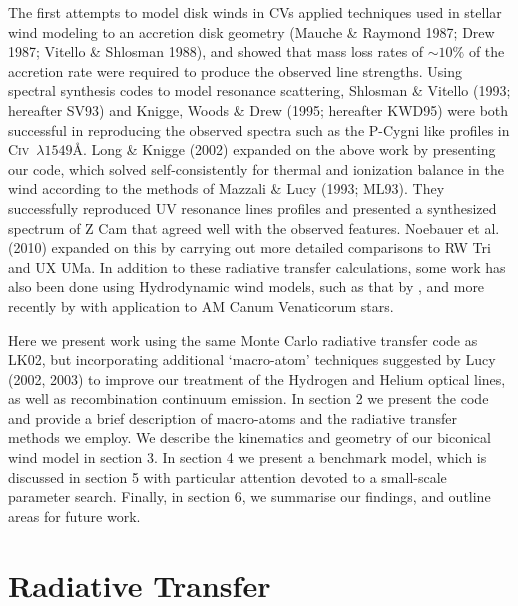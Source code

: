 \documentclass[preprint, a4paper, 11pt]{aastex}
\begin{document}
The first attempts to model disk winds in CVs applied techniques used in stellar
wind modeling to an accretion disk geometry (Mauche \& Raymond
1987; Drew 1987; Vitello \& Shlosman 1988), and showed that mass loss rates of
$\sim10\%$ of the accretion rate
were required to produce the observed line strengths.
Using spectral synthesis codes to model resonance scattering,
Shlosman \& Vitello (1993; hereafter SV93) and Knigge, Woods \& Drew (1995; hereafter KWD95)
were both successful in reproducing the observed spectra such as the P-Cygni like
profiles in C\textsc{iv}~$\lambda1549$\AA.
Long \& Knigge (2002) expanded on the above work by presenting our code, which
solved self-consistently for thermal and ionization balance in the wind
according to the methods of Mazzali \& Lucy (1993; ML93). They successfully reproduced
UV resonance lines profiles and presented a synthesized spectrum of Z Cam
that agreed well with the observed features. Noebauer et al. (2010) expanded on this
by carrying out more detailed comparisons to RW Tri and UX UMa. In addition to these 
radiative transfer calculations, some work has also been done using Hydrodynamic wind models, 
such as that by \cite{pkdh2002}, and more recently by \cite{kusterer2014} with application to
AM Canum Venaticorum stars.


Here we present work using the same Monte Carlo radiative transfer code as LK02, but incorporating additional 
`macro-atom' techniques suggested by Lucy (2002, 2003) to improve our treatment of the Hydrogen and Helium
optical lines, as well as recombination continuum emission. 
In section 2 we present the code
and provide a brief description of macro-atoms and the radiative transfer methods we employ. 
We describe the kinematics and geometry of our biconical wind model in section 3.
In section 4 we present a benchmark model, which is discussed in section 5 with particular attention 
devoted to a small-scale parameter search.
Finally, in section 6, we summarise our findings, and outline areas for future work.








%
%

\section{Radiative Transfer}
\end{document}
